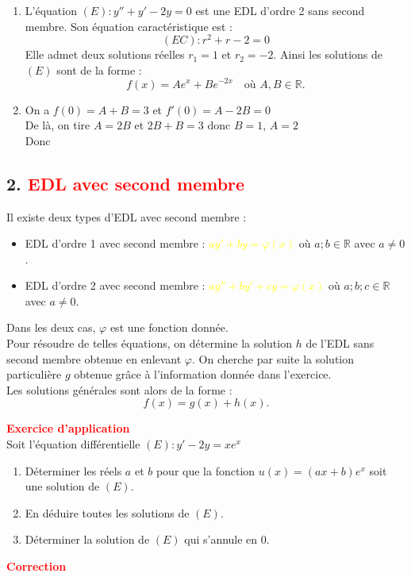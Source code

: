 \documentclass[a4paper,12pt]{article}
\begin{document}
\begin{enumerate}
    \item L’équation $(E) : y'' + y' - 2y = 0$ est une EDL d’ordre 2 sans second membre. Son équation caractéristique est :
    \[
    (EC) : r^2 + r - 2 = 0
    \]
    Elle admet deux solutions réelles $r_1 = 1$ et $r_2 = -2$. Ainsi les solutions de $(E)$ sont de la forme :
    \[
    \boxed{f(x) = Ae^{x} + Be^{-2x}} \quad \text{où } A, B \in \mathbb{R}.
    \]

    \item On a $f(0) = A + B = 3$ et $f'(0) = A - 2B = 0$\\
    De là, on tire $A = 2B$ et $2B + B = 3$ donc $B = 1$, $A = 2$\\
    Donc 
\end{enumerate}

\subsection*{2. \textcolor{red}{EDL avec second membre}}

Il existe deux types d’EDL avec second membre :

\begin{itemize}
    \item EDL d’ordre 1 avec second membre : \textcolor{yellow}{$ay' + by = \varphi(x)$} où $a ; b \in \mathbb{R}$ avec $a \neq 0$.
    \item EDL d’ordre 2 avec second membre : \textcolor{yellow}{$ay'' + by' + cy = \varphi(x)$} où $a ; b ; c \in \mathbb{R}$ avec $a \neq 0$.
\end{itemize}

Dans les deux cas, $\varphi$ est une fonction donnée.\\

Pour résoudre de telles équations, on détermine la solution $h$ de l’EDL sans second membre obtenue en enlevant $\varphi$. On cherche par suite la solution particulière $g$ obtenue grâce à l’information donnée dans l’exercice.\\

Les solutions générales sont alors de la forme : 
\[
\boxed{f(x) = g(x) + h(x)}.
\]

\vspace{0.4cm}
\textbf{\textcolor{red}{Exercice d'application}}\\
Soit l’équation différentielle $(E) : y' - 2y = xe^x$
\begin{enumerate}
    \item Déterminer les réels $a$ et $b$ pour que la fonction $u(x) = (ax + b)e^x$ soit une solution de $(E)$.
    \item En déduire toutes les solutions de $(E)$.
    \item Déterminer la solution de $(E)$ qui s’annule en $0$.
\end{enumerate}
\textbf{\textcolor{red}{Correction}}\\
\end{document}
